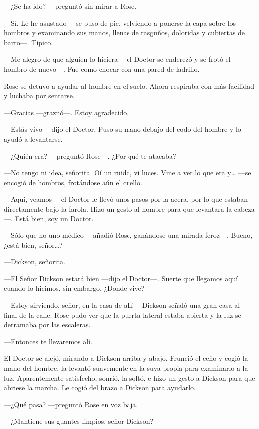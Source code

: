{---¿Se ha ido? ---preguntó sin mirar a Rose.}

{---Sí. Le he asustado ---se puso de pie, volviendo a ponerse la capa
sobre los hombros y examinando sus manos, llenas de rasguños, doloridas
y cubiertas de barro---. Típico.}

{---Me alegro de que alguien lo hiciera ---el Doctor se enderezó y se
frotó el hombro de nuevo---. Fue como chocar con una pared de ladrillo.}

{Rose se detuvo a ayudar al hombre en el suelo. Ahora respiraba con más
facilidad y luchaba por sentarse.}

{---Gracias ---graznó---. Estoy agradecido.}

{---Estás vivo ---dijo el Doctor. Puso su mano debajo del codo del
hombre y lo ayudó a levantarse.}

{---¿Quién era? ---preguntó Rose---. ¿Por qué te atacaba?}

{---No tengo ni idea, señorita. Oí un ruido, vi luces. Vine a ver lo que
era y\ldots{} ---se encogió de hombros, frotándose aún el cuello.}

{---Aquí, veamos ---el Doctor le llevó unos pasos por la acera, por lo
que estaban directamente bajo la farola. Hizo un gesto al hombre para
que levantara la cabeza---. Está bien, soy un Doctor.}

{---Sólo que no uno médico ---añadió Rose, ganándose una mirada
feroz---. Bueno, ¿está bien, señor\ldots{}?}

{---Dickson, señorita.}

{---El Señor Dickson estará bien ---dijo el Doctor---. Suerte que
llegamos aquí cuando lo hicimos, sin embargo. ¿Donde vive?}

{---Estoy sirviendo, señor, en la casa de allí ---Dickson señaló una
gran casa al final de la calle. Rose pudo ver que la puerta lateral
estaba abierta y la luz se derramaba por las escaleras.}

{---Entonces te llevaremos alí.}

{El Doctor se alejó, mirando a Dickson arriba y abajo. Frunció el ceño y
cogió la mano del hombre, la levantó suavemente en la suya propia para
examinarlo a la luz. Aparentemente satisfecho, sonrió, la soltó, e hizo
un gesto a Dickson para que abriese la marcha. Le cogió del brazo a
Dickson para ayudarlo.}

{---¿Qué pasa? ---preguntó Rose en voz baja.}

{---¿Mantiene sus guantes limpios, señor Dickson?}

